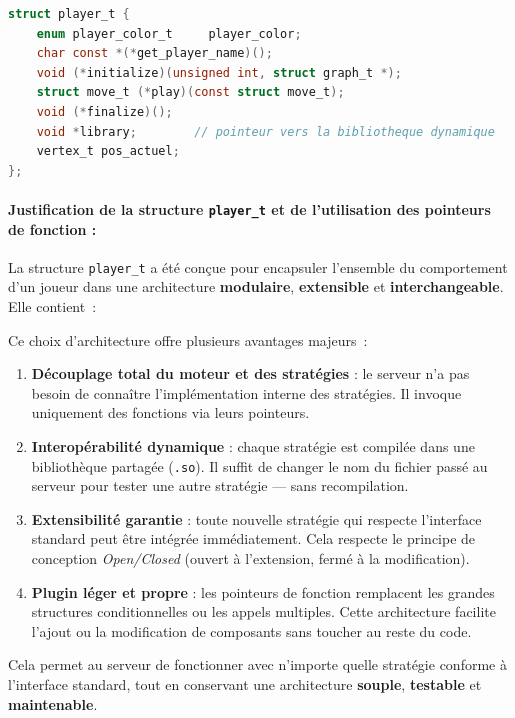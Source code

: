 \begin{lstlisting}[language=C]
struct player_t {
    enum player_color_t     player_color;
    char const *(*get_player_name)();
    void (*initialize)(unsigned int, struct graph_t *);
    struct move_t (*play)(const struct move_t);
    void (*finalize)();
    void *library;        // pointeur vers la bibliotheque dynamique
    vertex_t pos_actuel;
};
\end{lstlisting}
\paragraph{Justification de la structure \texttt{player\_t} et de l'utilisation des pointeurs de fonction :}

La structure \texttt{player\_t} a été conçue pour encapsuler l'ensemble du comportement d'un joueur dans une architecture \textbf{modulaire}, \textbf{extensible} et \textbf{interchangeable}. Elle contient :

\vspace{0.3cm}

\noindent Ce choix d’architecture offre plusieurs avantages majeurs :

\begin{enumerate}
  \item \textbf{Découplage total du moteur et des stratégies} : le serveur n’a pas besoin de connaître l’implémentation interne des stratégies. Il invoque uniquement des fonctions via leurs pointeurs.

  \item \textbf{Interopérabilité dynamique} : chaque stratégie est compilée dans une bibliothèque partagée (\texttt{.so}). Il suffit de changer le nom du fichier passé au serveur pour tester une autre stratégie — sans recompilation.

  \item \textbf{Extensibilité garantie} : toute nouvelle stratégie qui respecte l’interface standard peut être intégrée immédiatement. Cela respecte le principe de conception \textit{Open/Closed} (ouvert à l’extension, fermé à la modification).

  \item \textbf{Plugin léger et propre} : les pointeurs de fonction remplacent les grandes structures conditionnelles ou les appels multiples. Cette architecture facilite l’ajout ou la modification de composants sans toucher au reste du code.
\end{enumerate}

\vspace{0.4cm}


Cela permet au serveur de fonctionner avec n’importe quelle stratégie conforme à l’interface standard, tout en conservant une architecture \textbf{souple}, \textbf{testable} et \textbf{maintenable}.
